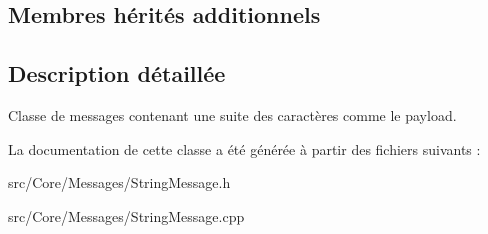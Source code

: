 \subsection*{Membres hérités additionnels}


\subsection{Description détaillée}
Classe de messages contenant une suite des caractères comme le payload. 

La documentation de cette classe a été générée à partir des fichiers suivants \-:\begin{DoxyCompactItemize}
\item 
src/\-Core/\-Messages/String\-Message.\-h\item 
src/\-Core/\-Messages/String\-Message.\-cpp\end{DoxyCompactItemize}
